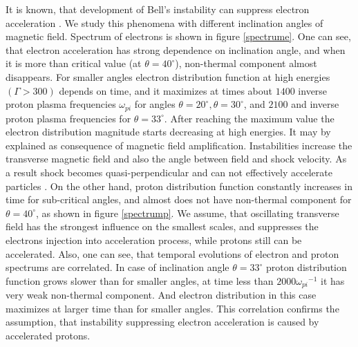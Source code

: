 \documentclass[a4paper]{jpconf}
\begin{document}
	It is known, that development of Bell's instability can suppress electron acceleration \cite{Crumley2019,2021MNRAS.501.4837L,2021MNRAS.502.5065L}. We study this phenomena with different inclination angles of magnetic field. Spectrum of electrons is shown in figure \ref{spectrume}. One can see, that electron acceleration has strong dependence on inclination angle, and when it is more than critical value (at $\theta = 40^\circ$), non-thermal component almost disappears. For smaller angles electron distribution function at high energies $(\Gamma > 300)$ depends on time, and it maximizes at times about $1400$ inverse proton plasma frequencies $\omega_{pi}$ for angles $\theta=20^\circ, \theta=30^\circ$, and $2100$ and inverse proton plasma frequencies for $\theta = 33^\circ$. After reaching the maximum value the electron distribution magnitude starts decreasing at high energies. It may by explained as consequence of magnetic field amplification. Instabilities increase the transverse magnetic field and also the angle between field and shock velocity. As a result shock becomes quasi-perpendicular and can not effectively accelerate particles \cite{Sironi2011,Romansky18}. On the other hand, proton distribution function constantly increases in time for sub-critical angles, and almost does not have non-thermal component for $\theta = 40^\circ$, as shown in figure \ref{spectrump}. We assume, that oscillating transverse field has the strongest influence on the smallest scales, and suppresses the electrons injection into acceleration process, while protons still can be accelerated. Also, one can see, that temporal evolutions of electron and proton spectrums are correlated. In case of inclination angle $\theta = 33^\circ$ proton distribution function grows slower than for smaller angles, at time less than $2000 {\omega_{pi}}^{-1}$  it has very weak non-thermal component. And electron distribution in this case maximizes at larger time than for smaller angles. This correlation confirms the assumption, that instability suppressing electron acceleration is caused by accelerated protons.
	
\end{document}
